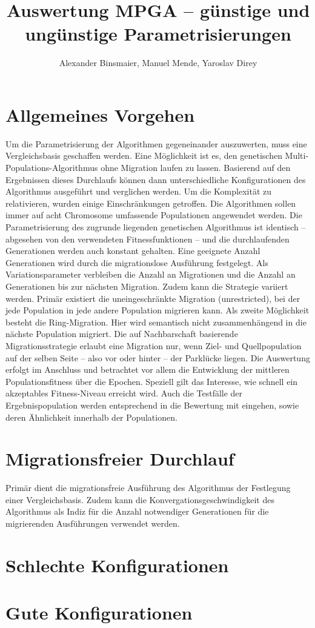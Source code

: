 \documentclass[12pt,a4paper]{article}
\author{Alexander Binsmaier, Manuel Mende, Yaroslav Direy}
\title{Auswertung MPGA -- günstige und ungünstige Parametrisierungen}
\begin{document}
\maketitle
\tableofcontents
\section{Allgemeines Vorgehen}
Um die Parametrisierung der Algorithmen gegeneinander auszuwerten, muss eine Vergleichsbasis geschaffen werden. Eine Möglichkeit ist es, den genetischen Multi-Populations-Algorithmus ohne Migration laufen zu lassen. Basierend auf den Ergebnissen dieses Durchlaufs können dann unterschiedliche Konfigurationen des Algorithmus ausgeführt und verglichen werden. Um die Komplexität zu relativieren, wurden einige Einschränkungen getroffen. Die Algorithmen sollen immer auf acht Chromosome umfassende Populationen angewendet werden. Die Parametrisierung des zugrunde liegenden genetischen Algorithmus ist identisch -- abgesehen von den verwendeten Fitnessfunktionen -- und die durchlaufenden Generationen werden auch konstant gehalten. Eine geeignete Anzahl Generationen wird durch die migrationslose Ausführung festgelegt. Als Variationsparameter verbleiben die Anzahl an Migrationen und die Anzahl an Generationen bis zur nächsten Migration. Zudem kann die Strategie variiert werden.
Primär existiert die uneingeschränkte Migration (unrestricted), bei der jede Population in jede andere Population migrieren kann. Als zweite Möglichkeit besteht die Ring-Migration. Hier wird semantisch nicht zusammenhängend in die nächste Population migriert. Die auf Nachbarschaft basierende Migrationsstrategie erlaubt eine Migration nur, wenn Ziel- und Quellpopulation auf der selben Seite -- also vor oder hinter -- der Parklücke liegen. 
Die Auswertung erfolgt im Anschluss und betrachtet vor allem die Entwicklung der mittleren Populationsfitness über die Epochen. Speziell gilt das Interesse, wie schnell ein akzeptables Fitness-Niveau erreicht wird. Auch die Testfälle der Ergebnispopulation werden entsprechend in die Bewertung mit eingehen, sowie deren Ähnlichkeit innerhalb der Populationen.

\section{Migrationsfreier Durchlauf}
Primär dient die migrationsfreie Ausführung des Algorithmus der Festlegung einer Vergleichsbasis. Zudem kann die Konvergationsgeschwindigkeit des Algorithmus als Indiz für die Anzahl notwendiger Generationen für die migrierenden Ausführungen verwendet werden.

\section{Schlechte Konfigurationen}
\section{Gute Konfigurationen}
\end{document}

